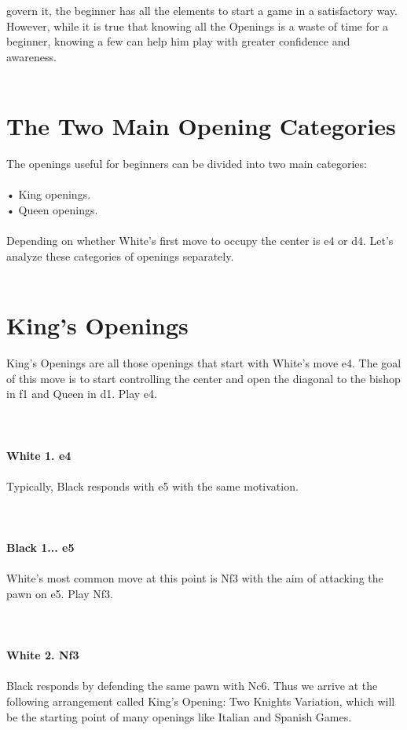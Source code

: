 \documentclass{article}
\begin{document}
govern it, the beginner has all the elements to start a game in a satisfactory way. However, while it is true that knowing all the Openings is a waste of time for a beginner, knowing a few can help him play with greater confidence and awareness.\\
\\
\section{ The Two Main Opening Categories}

The openings useful for beginners can be divided into two main categories:\\\\• King openings.\\• Queen openings.\\\\Depending on whether White's first move to occupy the center is e4 or d4. Let's analyze these categories of openings separately.\\
\\
\section{ King's Openings}

King's Openings are all those openings that start with White's move e4. The goal of this move is to start controlling the center and open the diagonal to the bishop in f1 and Queen in d1. Play e4.\\
\\

\\
\\
\textbf{White 1. e4}\\
\\
Typically, Black responds with e5 with the same motivation.\\
\\

\\
\\
\textbf{Black 1... e5}\\
\\
White's most common move at this point is Nf3 with the aim of attacking the pawn on e5. Play Nf3.\\
\\

\\
\\
\textbf{White 2. Nf3}\\
\\
Black responds by defending the same pawn with Nc6. Thus we arrive at the following arrangement called King's Opening: Two Knights Variation, which will be the starting point of many openings like Italian and Spanish Games.\\
\\
\end{document}
